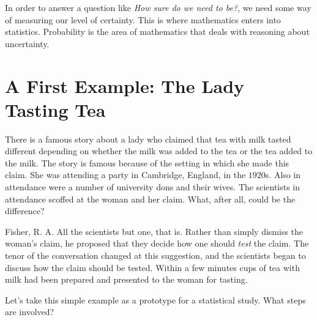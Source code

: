 \documentclass[]{book}
\begin{document}
In order to answer a question like \emph{How sure do we need to be?}, we need some way of measuring our level of certainty. This is where mathematics enters into statistics. Probability is the area of mathematics that deals with reasoning about uncertainty.

\hypertarget{a-first-example-the-lady-tasting-tea}{%
\section{A First Example: The Lady Tasting Tea}\label{a-first-example-the-lady-tasting-tea}}

There is a famous story about a lady who claimed that tea with milk tasted different depending on whether the milk was added to the tea or the tea added to the milk. The story is famous because of the setting in which she made this claim. She was attending a party in Cambridge, England, in the \(1920\)s. Also in attendance were a number of university dons and their wives. The scientists in attendance scoffed at the woman and her claim. What, after all, could be the difference?

Fisher, R. A.
All the scientists but one, that is. Rather than simply dismiss the woman's claim, he proposed that they decide how one should \emph{test} the claim. The tenor of the conversation changed at this suggestion, and the scientists began to discuss how the claim should be tested. Within a few minutes cups of tea with milk had been prepared and presented to the woman for tasting.

Let's take this simple example as a prototype for a statistical study.
What steps are involved?\\
\end{document}
